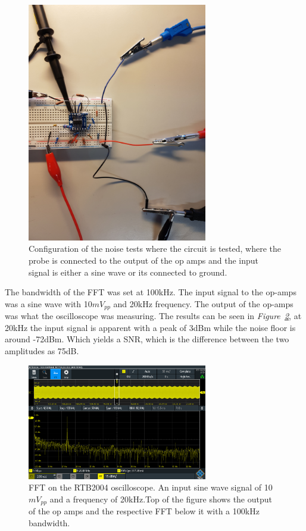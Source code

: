\begin{figure}[h]
    \centering
    \includegraphics[width=0.7\textwidth]{graphics/TESTINGwSineinp.jpg}
    \caption{Configuration of the noise tests where the circuit is tested, where the probe is connected to the output of the op amps and the input signal is either a sine wave or its connected to ground.}
    \label{fig:SetupFFT}
\end{figure}

The bandwidth of the FFT was set at 100kHz.
The input signal to the op-amps was a sine wave with 10$mV_{pp}$ and 20kHz frequency.
The output of the op-amps was what the oscilloscope was measuring.
The results can be seen in \textit{Figure~\ref{fig:Noise20k10mVpp100kband}}, at 20kHz the input signal is apparent with a peak of 3dBm while the noise floor is around -72dBm.
Which yields a SNR, which is the difference between the two amplitudes as 75dB.


\begin{figure}[h]
    \centering
    \includegraphics[width=0.7\textwidth]{graphics/Noise20k10mVpp100kband.PNG}
    \caption{FFT on the RTB2004 oscilloscope. An input sine wave signal of 10$mV_{pp}$ and a frequency of 20kHz.Top of the figure shows the output of the op amps and the respective FFT below it with a 100kHz bandwidth.}
    \label{fig:Noise20k10mVpp100kband}
\end{figure}




